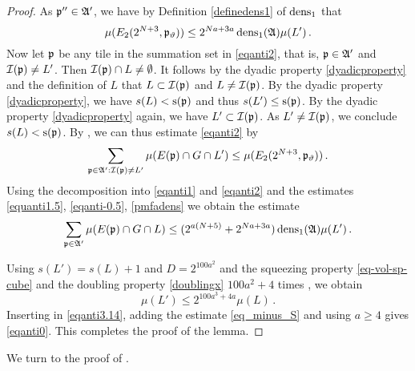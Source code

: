 \begin{proof}
As ${\mathfrak p}''\in \mathfrak{A}'$, we have by Definition
\eqref{definedens1} of $\operatorname{\operatorname{dens}}_1$ that
\begin{equation}\label{pmfadens}
   \mu(E_2(2^{N+3}, {\mathfrak p}_{{\vartheta}}))\le 2^{Na+3a}\operatorname{\operatorname{dens}}_1(\mathfrak{A}) {\mu(L')}\, .
\end{equation}
Now let ${\mathfrak p}$ be any tile in the summation set in \eqref{eqanti2}, that is, ${\mathfrak p}\in \mathfrak{A}'$ and ${\mathcal{I}}({\mathfrak p})\neq L'$.
Then ${\mathcal{I}}({\mathfrak p})\cap L\neq \emptyset$. It follows by the dyadic property \eqref{dyadicproperty}
and the definition of $L$ that
$L\subset {\mathcal{I}}({\mathfrak p})$ and $L\neq {\mathcal{I}}({\mathfrak p})$. By the dyadic property \eqref{dyadicproperty}, we have
$s(L)<{\mathrm{s}}({\mathfrak p})$ and thus $s(L')\le {\mathrm{s}}({\mathfrak p})$. By the dyadic property
   \eqref{dyadicproperty} again, we have $L'\subset {\mathcal{I}}({\mathfrak p})$.
As $L'\neq {\mathcal{I}}({\mathfrak p})$, we conclude $s(L)<{\mathrm{s}}({\mathfrak p})$.
By , we can thus estimate \eqref{eqanti2} by
\begin{equation}\label{eqanti0.5}
    \sum_{{\mathfrak p}\in\mathfrak{A}':{\mathcal{I}}({\mathfrak p})\neq L'}\mu(E({\mathfrak p})\cap G\cap L')
    \le \mu (E_2(2^{N+3},{\mathfrak p}_{{\vartheta}}))\, .
\end{equation}
Using the decomposition
into \eqref{eqanti1} and
\eqref{eqanti2} and the estimates
\eqref{equanti1.5},
\eqref{eqanti-0.5},
\eqref{pmfadens} we obtain the estimate
\begin{equation}\label{eqanti3.14}
\sum_{{\mathfrak p}\in\mathfrak{A}'}\mu(E({\mathfrak p})\cap G \cap L)
    \le (2^{a(N+5)}+2^{Na+3a})\operatorname{\operatorname{dens}}_1(\mathfrak{A})\mu(L')\,.
\end{equation}

Using $s(L')=s(L)+1$ and $D=2^{100a^2}$ and the
squeezing property \eqref{eq-vol-sp-cube}
and the doubling property \eqref{doublingx} $100a^2+4$ times , we obtain
\begin{equation}
    \mu(L')\le 2^{100a^3+4a}\mu(L)\, .
\end{equation}
Inserting in \eqref{eqanti3.14}, adding the estimate \eqref{eq_minus_S} and using $a\ge 4$ gives \eqref{eqanti0}.
This completes the proof of the lemma.
\end{proof}



We turn to the proof of .

